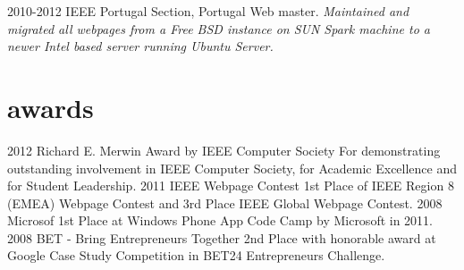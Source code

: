 \documentclass[]{friggeri-cv}
\begin{document}
\begin{entrylist}     
  \entry
    {2010-2012}
    {IEEE Portugal Section, Portugal}
    {Web master.}
    {\emph{Maintained and migrated all webpages from a Free BSD instance on SUN Spark machine to a newer Intel based server running Ubuntu Server.}}

\end{entrylist}

\section{awards}

\begin{entrylist}
  \entry
    {2012}
    {Richard E. Merwin Award by IEEE Computer Society}
    {}
    {For demonstrating outstanding involvement in IEEE Computer Society, for Academic Excellence and for Student Leadership.}
  \entry
    {2011}
    {IEEE Webpage Contest}
    { }
    {1st Place of IEEE Region 8 (EMEA) Webpage Contest and 3rd Place IEEE Global Webpage Contest.}
  \entry
    {2008}
    {Microsof}
    {}
    {1st Place at Windows Phone App Code Camp by Microsoft in 2011.}
  \entry
    {2008}
    {BET - Bring Entrepreneurs Together}
    {}
    {2nd Place with honorable award at Google Case Study Competition in BET24 Entrepreneurs Challenge.}    
\end{entrylist}

\end{document}
